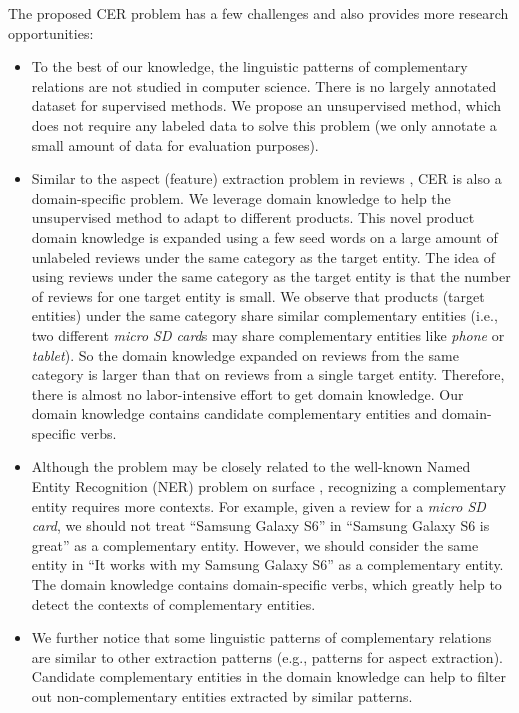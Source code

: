 The proposed CER problem has a few challenges and also provides more research opportunities:
\begin{itemize}
	\item To the best of our knowledge, the linguistic patterns of complementary relations are not studied in computer science. There is no largely annotated dataset for supervised methods. We propose an unsupervised method, which does not require any labeled data to solve this problem (we only annotate a small amount of data for evaluation purposes).
	\item Similar to the aspect (feature) extraction problem in reviews \cite{liu2015sentiment}, CER is also a domain-specific problem. We leverage domain knowledge to help the unsupervised method to adapt to different products. This novel product domain knowledge is expanded using a few seed words on a large amount of unlabeled reviews under the same category as the target entity. The idea of using reviews under the same category as the target entity is that the number of reviews for one target entity is small. We observe that products (target entities) under the same category share similar complementary entities (i.e., two different \textit{micro SD card}s may share complementary entities like \textit{phone} or \textit{tablet}). So the domain knowledge expanded on reviews from the same category is larger than that on reviews from a single target entity. Therefore, there is almost no labor-intensive effort to get domain knowledge. Our domain knowledge contains candidate complementary entities and domain-specific verbs.
	\item Although the problem may be closely related to the well-known Named Entity Recognition (NER) problem on surface \cite{nadeau2007survey}, recognizing a complementary entity requires more contexts. For example, given a review for a \textit{micro SD card}, we should not treat ``Samsung Galaxy S6'' in ``Samsung Galaxy S6 is great'' as a complementary entity. However, we should consider the same entity in ``It works with my Samsung Galaxy S6'' as a complementary entity. The domain knowledge contains domain-specific verbs, which greatly help to detect the contexts of complementary entities.
	\item We further notice that some linguistic patterns of complementary relations are similar to other extraction patterns (e.g., patterns for aspect extraction). Candidate complementary entities in the domain knowledge can help to filter out non-complementary entities extracted by similar patterns.
\end{itemize}

